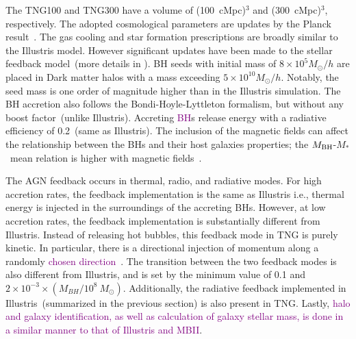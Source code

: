 \documentclass[twocolumn]{aastex631}
\newcommand{\red}[1]{\textcolor{purple}{#1}}
\def\smass{{$M_*$}}
\def\mbh{$M_{\rm BH}$}
\begin{document}
The TNG100 and TNG300 have a volume of (100~cMpc)$^3$ and (300~cMpc)$^3$, respectively. The adopted cosmological parameters are updates by the Planck result~\citep{2016A&A...594A..13P}.
The gas cooling and star formation prescriptions are broadly similar to the Illustris model. However significant updates have been made to the stellar feedback model~(more details in \citealt{2018MNRAS.473.4077P}).
BH seeds with initial mass of $8 \times 10^5 M_{\odot}/h$ are placed in Dark matter halos with a mass exceeding $5 \times 10^{10} M_{\odot}/h$. Notably, the seed mass is one order of magnitude higher than in the Illustris simulation. The BH accretion also follows the Bondi-Hoyle-Lyttleton formalism, but without any boost factor~(unlike Illustris). Accreting \red{BH}s release energy with a radiative efficiency of 0.2~(same as Illustris). The inclusion of the magnetic fields can affect the relationship between the BHs and their host galaxies properties; the \mbh-\smass\ mean relation is higher with magnetic fields~\citep{2018MNRAS.473.4077P}. 

The AGN feedback occurs in thermal, radio, and radiative modes. For high accretion rates, the feedback implementation is the same as Illustris i.e., thermal energy is injected in the surroundings of the accreting BHs. However, at low accretion rates, the feedback implementation is substantially different from Illustris. Instead of releasing hot bubbles, this feedback mode in TNG is purely kinetic. In particular, there is a directional injection of momentum along a randomly \red{chosen direction~\citep{2017MNRAS.465.3291W, 2018MNRAS.479.4056W}}. %
The transition between the two feedback modes is also different from Illustris, and is set by the minimum value of 0.1 and $2 \times 10 ^{-3} \times (M_{BH} / 10^8~M_{\odot})$. Additionally, the radiative feedback implemented in Illustris~(summarized in the previous section) is also present in TNG. Lastly, \red{halo and galaxy identification, as well as calculation of galaxy stellar mass, is done in a similar manner to that of Illustris and MBII}.
\end{document}
